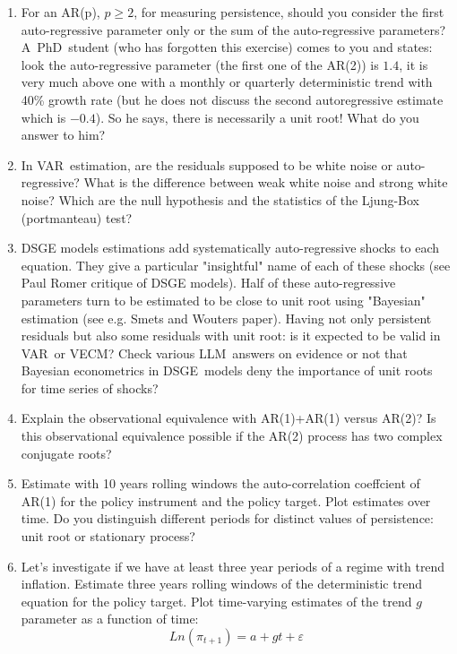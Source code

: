 \documentclass[12pt,a4paper]{article}%
\begin{document}
\begin{enumerate}
\item For an AR(p), $p\geq2$, for measuring persistence, should you consider
the first auto-regressive parameter only or the sum of the auto-regressive
parameters? A\ PhD\ student (who has forgotten this exercise) comes to you and
states: look the auto-regressive parameter (the first one of the AR(2)) is
$1.4$, it is very much above one with a monthly or quarterly deterministic
trend with 40\% growth rate (but he does not discuss the second autoregressive
estimate which is $-0.4$). So he says, there is necessarily a unit root! What
do you answer to him?

\item In VAR\ estimation, are the residuals supposed to be white noise or
auto-regressive? What is the difference between weak white noise and strong
white noise? Which are the null hypothesis and the statistics of the Ljung-Box
(portmanteau) test?

\item DSGE models estimations add systematically auto-regressive shocks to
each equation. They give a particular "insightful" name of each of these
shocks (see Paul Romer critique of DSGE models). Half of these auto-regressive
parameters turn to be estimated to be close to unit root using "Bayesian"
estimation (see e.g. Smets and Wouters paper). Having not only persistent
residuals but also some residuals with unit root: is it expected to be valid
in VAR\ or VECM? Check various LLM\ answers on evidence or not that Bayesian
econometrics in DSGE\ models deny the importance of unit roots for time series
of shocks?

\item Explain the observational equivalence with AR(1)+AR(1) versus AR(2)? Is
this observational equivalence possible if the AR(2) process has two complex
conjugate roots?

\item Estimate with 10 years rolling windows the auto-correlation coeffcient
of AR(1) for the policy instrument and the policy target. Plot estimates over
time. Do you distinguish different periods for distinct values of persistence:
unit root or stationary process?

\item Let's investigate if we have at least three year periods of a regime
with trend inflation. Estimate three years rolling windows of the
deterministic trend equation for the policy target. Plot time-varying
estimates of the trend $g$ parameter as a function of time:
\[
Ln(\pi_{t+1})=a+gt+\varepsilon
\]



\end{enumerate}
\end{document}

